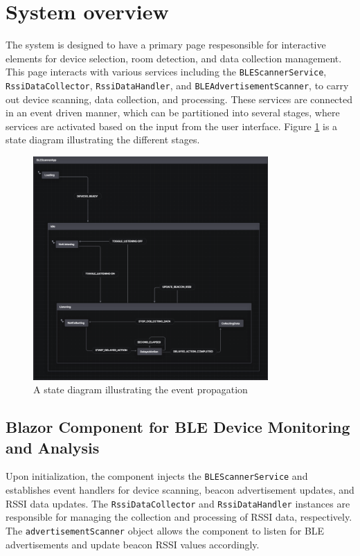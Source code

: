 \section{System overview}
The system is designed to have a primary page respesonsible for interactive elements for device selection, room detection, and data collection management. This page interacts with various services including the \texttt{BLEScannerService}, \texttt{RssiDataCollector}, \texttt{RssiDataHandler}, and \texttt{BLEAdvertisementScanner}, to carry out device scanning, data collection, and processing.
These services are connected in an event driven manner, which can be partitioned into several stages, where services are activated based on the input from the user interface. 
Figure \ref{fig:StateDiagram} is a state diagram illustrating the different stages. 

\begin{figure}[H]
    \centering
    \includegraphics[width=0.8\textwidth]{images/StateDiagram.png}
    \caption{A state diagram illustrating the event propagation}
    \label{fig:StateDiagram}
\end{figure}


\subsection{Blazor Component for BLE Device Monitoring and Analysis}

Upon initialization, the component injects the \texttt{BLEScannerService} and establishes event handlers for device scanning, beacon advertisement updates, and RSSI data updates. The \texttt{RssiDataCollector} and \texttt{RssiDataHandler} instances are responsible for managing the collection and processing of RSSI data, respectively. The \texttt{advertisementScanner} object allows the component to listen for BLE advertisements and update beacon RSSI values accordingly.

